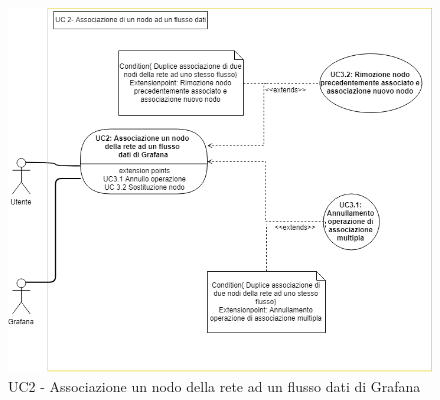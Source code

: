                		\begin{figure}[!htbp]
		                	\centering
		                	\includegraphics[width=\textwidth]{UC2.png}
		                	\caption{UC2 - Associazione un nodo della rete ad un flusso dati di Grafana}
		                \end{figure}
	                \clearpage
                
